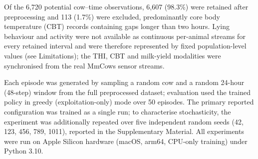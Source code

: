 

Of the 6{,}720 potential cow--time observations, 6{,}607 (98.3\%) were
retained after preprocessing and 113 (1.7\%) were excluded, predominantly
core body temperature (CBT) records containing gaps longer than two hours.
Lying behaviour and activity were not available as continuous per-animal
streams for every retained interval and were therefore represented by fixed
population-level values (see Limitations); the THI, CBT and milk-yield
modalities were synchronised from the real MmCows sensor streams.


Each episode was generated by sampling a random cow and a random 24-hour
(48-step) window from the full preprocessed dataset; evaluation used the
trained policy in greedy (exploitation-only) mode over 50 episodes. The
primary reported configuration was trained as a single run; to characterise
stochasticity, the experiment was additionally repeated over five independent
random seeds (42, 123, 456, 789, 1011), reported in the Supplementary Material.
All experiments were run on Apple Silicon hardware (macOS, arm64, CPU-only
training) under Python 3.10.



